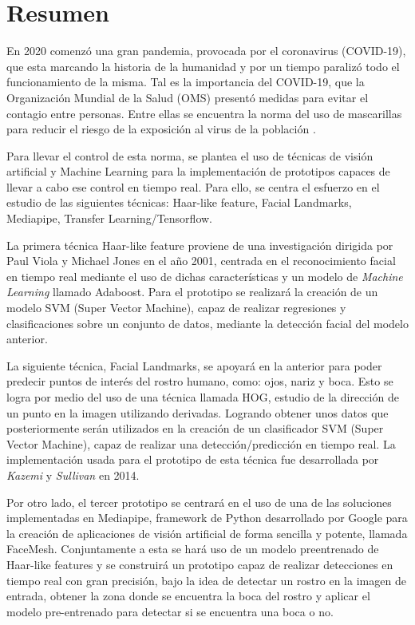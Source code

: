 
\chapter*{Resumen}

En 2020 comenzó una gran pandemia, provocada por el coronavirus (COVID-19), que esta marcando la historia de la humanidad y por un tiempo paralizó todo el funcionamiento de la misma. Tal es la importancia del COVID-19, que la Organización Mundial de la Salud (OMS) presentó medidas para evitar el contagio entre personas. Entre ellas se encuentra la norma del uso de mascarillas para reducir el riesgo de la exposición al virus de la población \cite{oms}. 

Para llevar el control de esta norma, se plantea el uso de técnicas de visión artificial y Machine Learning para la implementación de prototipos capaces de llevar a cabo ese control en tiempo real. Para ello, se centra el esfuerzo en el estudio de las siguientes técnicas: Haar-like feature, Facial Landmarks, Mediapipe, Transfer Learning/Tensorflow. 

La primera técnica Haar-like feature proviene de una investigación dirigida por Paul Viola y Michael Jones en el año 2001, centrada en el reconocimiento facial en tiempo real mediante el uso de dichas características y un modelo de \textit{Machine Learning} llamado Adaboost. Para el prototipo se realizará la creación de un modelo SVM (Super Vector Machine), capaz de realizar regresiones y clasificaciones sobre un conjunto de datos, mediante la detección facial del modelo anterior.

La siguiente técnica, Facial Landmarks, se apoyará en la anterior para poder predecir puntos de interés del rostro humano, como: ojos, nariz y boca. Esto se logra por medio del uso de una técnica llamada HOG, estudio de la dirección de un punto en la imagen utilizando derivadas. Logrando obtener unos datos que posteriormente serán utilizados en la creación de un clasificador SVM (Super Vector Machine), capaz de realizar una detección/predicción en tiempo real. La implementación usada para el prototipo de esta técnica fue desarrollada por \textit{Kazemi} y \textit{Sullivan} en 2014.

Por otro lado, el tercer prototipo se centrará en el uso de una de las soluciones implementadas en Mediapipe, framework de Python desarrollado por Google para la creación de aplicaciones de visión artificial de forma sencilla y potente, llamada FaceMesh. Conjuntamente a esta se hará uso de un modelo preentrenado de Haar-like features y se construirá un prototipo capaz de realizar detecciones en tiempo real con gran precisión, bajo la idea de detectar un rostro en la imagen de entrada, obtener la zona donde se encuentra la boca del rostro y aplicar el modelo pre-entrenado para detectar si se encuentra una boca o no.


